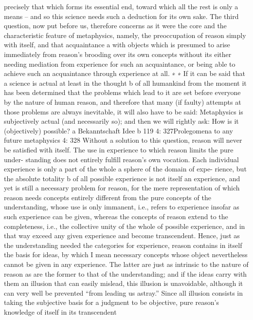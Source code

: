 precisely that which forms its essential end, toward which all the rest
is only a means – and so this science needs such a deduction for its own
sake. The third question, now put before us, therefore concerns as it
were the core and the characteristic feature of metaphysics, namely,
the preoccupation of reason simply with itself, and that acquaintance a
with objects which is presumed to arise immediately from reason’s
brooding over its own concepts without its either needing mediation
from experience for such an acquaintance, or being able to achieve such
an acquaintance through experience at all. ∗
∗ If it can be said that a science is actual at least in the thought b of all humankind
from the moment it has been determined that the problems which lead to it are
set before everyone by the nature of human reason, and therefore that many (if
faulty) attempts at those problems are always inevitable, it will also have to be
said: Metaphysics is subjectively actual (and necessarily so); and then we will
rightly ask: How is it (objectively) possible?
a Bekanntschaft
Idee
b
119
4: 327Prolegomena to any future metaphysics
4: 328
Without a solution to this question, reason will never be satisﬁed
with itself. The use in experience to which reason limits the pure under-
standing does not entirely fulﬁll reason’s own vocation. Each individual
experience is only a part of the whole a sphere of the domain of expe-
rience, but the absolute totality b of all possible experience is not itself an
experience, and yet is still a necessary problem for reason, for the mere
representation of which reason needs concepts entirely different from
the pure concepts of the understanding, whose use is only immanent, i.e.,
refers to experience insofar as such experience can be given, whereas the
concepts of reason extend to the completeness, i.e., the collective unity
of the whole of possible experience, and in that way exceed any given
experience and become transcendent.
Hence, just as the understanding needed the categories for experience,
reason contains in itself the basis for ideas, by which I mean necessary
concepts whose object nevertheless cannot be given in any experience.
The latter are just as intrinsic to the nature of reason as are the former
to that of the understanding; and if the ideas carry with them an illusion
that can easily mislead, this illusion is unavoidable, although it can very
well be prevented “from leading us astray.”
Since all illusion consists in taking the subjective basis for a judgment
to be objective, pure reason’s knowledge of itself in its transcendent
